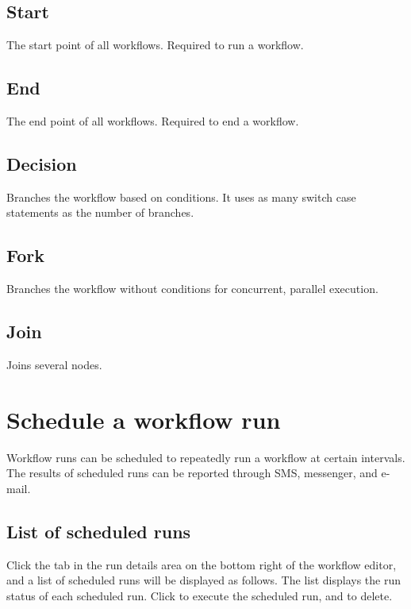 \documentclass[letterpaper,10pt,english]{sphinxmanual}
\begin{document}
\subsection{Start}
\label{\detokenize{integrator/part03/control_flow:start}}
The start point of all workflows. Required to run a workflow.


\subsection{End}
\label{\detokenize{integrator/part03/control_flow:end}}
The end point of all workflows. Required to end a workflow.


\subsection{Decision}
\label{\detokenize{integrator/part03/control_flow:decision}}
Branches the workflow based on conditions. It uses as many switch case statements as the number of branches.


\subsection{Fork}
\label{\detokenize{integrator/part03/control_flow:fork}}
Branches the workflow without conditions for concurrent, parallel execution.


\subsection{Join}
\label{\detokenize{integrator/part03/control_flow:join}}
Joins several nodes.


\section{Schedule a workflow run}
\label{\detokenize{integrator/part03/scheduled_run:scheduled-run}}\label{\detokenize{integrator/part03/scheduled_run:id1}}\label{\detokenize{integrator/part03/scheduled_run::doc}}
Workflow runs can be scheduled to repeatedly run a workflow at certain intervals. The results of scheduled runs can be reported through SMS, messenger, and e-mail.


\subsection{List of scheduled runs}
\label{\detokenize{integrator/part03/scheduled_run:id2}}
Click the  tab in the run details area on the bottom right of the workflow editor, and a list of scheduled runs will be displayed as follows. The list displays the run status of each scheduled run. Click  to execute the scheduled run, and  to delete.
\begin{quote}

\begin{figure}[H]
\centering

\noindent{}
\end{figure}
\end{quote}
\end{document}
